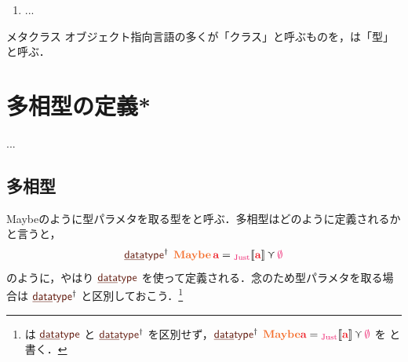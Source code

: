 \documentclass[a5paper,twoside,fleqn,draft]{jsbook}
\begin{document}
\begin{enumerate}
\item ...
\end{enumerate}

\begin{note}{メタクラス}
オブジェクト指向言語の多くが「クラス」と呼ぶものを，\haskell は「型」と呼ぶ．


\end{note}


\chapter{多相型の定義*}
\label{ch:polymorphic-data-type}
...

\section{多相型}

Maybeのように型パラメタを取る型をと呼ぶ．多相型はどのように定義されるかと言うと，
\begin{equation}
  \mDataTypePolymorphic\;
  \hMaybe\,\hTypeName{a}
  =\hJustWith{\hTypeName{a}}\mValueOr\hNothing
\end{equation}
のように，やはり $\mDataType$ を使って定義される．念のため型パラメタを取る場合は $\mDataTypePolymorphic$ と区別しておこう．\footnote{\haskell は $\mDataType$ と $\mDataTypePolymorphic$ を区別せず，$\mDataTypePolymorphic\;\hMaybe\hTypeName{a}=\hJustWith{\hTypeName{a} }\mValueOr\hNothing$ を  と書く．}
\end{document}
